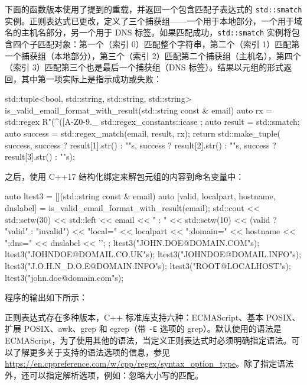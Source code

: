 下面的函数版本使用了提到的重载，并返回一个包含匹配子表达式的 \verb|std::smatch| 实例。正则表达式已更改，定义了三个捕获组——一个用于本地部分，一个用于域名的主机名部分，另一个用于 DNS 标签。如果匹配成功，\verb|std::smatch| 实例将包含四个子匹配对象：第一个（索引 0）匹配整个字符串，第二个（索引 1）匹配第一个捕获组（本地部分），第三个（索引 2）匹配第二个捕获组（主机名），第四个（索引 3）匹配第三个也是最后一个捕获组（DNS 标签）。结果以元组的形式返回，其中第一项实际上是指示成功或失败：

\begin{cpp}
std::tuple<bool, std::string, std::string, std::string>
is_valid_email_format_with_result(std::string const & email)
{
    auto rx = std::regex{
        R"(^([A-Z0-9._%
        std::regex_constants::icase };
    auto result = std::smatch{};
    auto success = std::regex_match(email, result, rx);
    return std::make_tuple(
        success,
        success ? result[1].str() : ""s,
        success ? result[2].str() : ""s,
        success ? result[3].str() : ""s);
}
\end{cpp}

之后，使用 C++17 结构化绑定来解包元组的内容到命名变量中：

\begin{cpp}
auto ltest3 = [](std::string const & email)
{
    auto [valid, localpart, hostname, dnslabel] =
    is_valid_email_format_with_result(email);
    std::cout << std::setw(30) << std::left
        << email << " : "
        << std::setw(10) << (valid ? "valid" : "invalid")
        << "local=" << localpart
        << ";domain=" << hostname
        << ";dns=" << dnslabel
        << '\n';
};
ltest3("JOHN.DOE@DOMAIN.COM"s);
ltest3("JOHNDOE@DOMAIL.CO.UK"s);
ltest3("JOHNDOE@DOMAIL.INFO"s);
ltest3("J.O.H.N_D.O.E@DOMAIN.INFO"s);
ltest3("ROOT@LOCALHOST"s);
ltest3("john.doe@domain.com"s);
\end{cpp}

程序的输出如下所示：



正则表达式存在多种版本，C++ 标准库支持六种：ECMAScript、基本 POSIX、扩展 POSIX、awk、grep 和 egrep（带 \verb|-E| 选项的 grep）。默认使用的语法是 ECMAScript，为了使用其他的语法，当定义正则表达式时必须明确指定语法。可以了解更多关于支持的语法选项的信息，参见 \url{https://en.cppreference.com/w/cpp/regex/syntax_option_type}。除了指定语法外，还可以指定解析选项，例如：忽略大小写的匹配。

